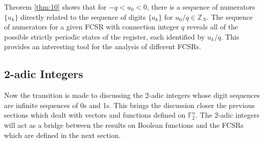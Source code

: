 \documentclass[english]{article}
\def\gftwo{\mathbb{F}_2}
\def\zzzn{\mathbb{Z}_N}
\theoremstyle{plain}
\theoremstyle{definition}
\theoremstyle{remark}
\begin{document}

\par Theorem \ref{thm:10} shows that for $-q<u_0<0$, there is a sequence of
numerators $\{u_k\}$ directly related to the sequence of digits $\{a_k\}$
for $u_0/q\in\zzzn$. The sequence of numerators for a given FCSR with connection
integer $q$ reveals all of the possible strictly periodic states of the
register, each identified by $u_k/q$. This provides an interesting tool for the
analysis of different FCSRs.


\subsection{2-adic Integers}
\par Now the transition is made to discussing the 2-adic integers whose digit
sequences are infinite sequences of 0s and 1s. This brings the discussion closer
the previous sections which dealt with vectors and functions defined on
$\gftwo^n$. The 2-adic integers will act as a bridge between the results on
Boolean functions and the FCSRs which are defined in the next section.
\end{document}
